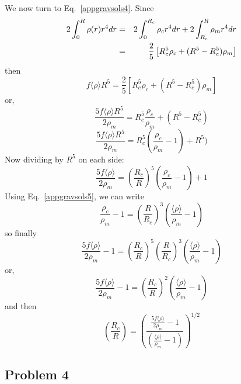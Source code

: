 We now turn to Eq.~\eqref{appgravsols4}. Since 
\begin{eqnarray}
2 \int_0^R \rho(r) r^4 dr 
&=&   2 \int_0^{R_c} \rho_c r^4 dr +  2 \int_{R_c}^R \rho_m r^4 dr \nonumber\\
&=& \frac{2}{5} \left[ R_c^5  \rho_c + (R^5-R_c^5) \rho_m  \right]  \nonumber
\end{eqnarray}
then 
\[
f \langle \rho \rangle R^5 = \frac{2}{5} \left[ R_c^5  \rho_c + (R^5-R_c^5) \rho_m  \right] 
\]
or, 
\[
\frac{5 f \langle \rho \rangle R^5}{2 \rho_m} =   R_c^5  \frac{\rho_c}{\rho_m} + (R^5-R_c^5)  
\]
\[
\frac{5 f \langle \rho \rangle R^5}{2 \rho_m} =   R_c^5  (\frac{\rho_c}{\rho_m}-1) + R^5)  
\]
Now dividing by $R^5$ on each side:
\[
\frac{5 f \langle \rho \rangle }{2 \rho_m} =  \left(\frac{R_c}{R}\right)^5    \left(\frac{\rho_c}{\rho_m}-1 \right) + 1 
\]
Using Eq.~\eqref{appgravsols5}, we can write 
\[
\frac{\rho_c}{\rho_m}-1  = 
\left(\frac{R}{R_c}\right)^3 \left(\frac{\langle \rho \rangle}{\rho_m} -1\right) 
\]
so finally
\[
\frac{5 f \langle \rho \rangle }{2 \rho_m} - 1=  \left(\frac{R_c}{R}\right)^5     
\left(\frac{R}{R_c}\right)^3 \left(\frac{\langle \rho \rangle}{\rho_m} -1\right) 
\]
or, 
\[
\frac{5 f \langle \rho \rangle }{2 \rho_m} - 1=  \left(\frac{R_c}{R}\right)^2     
 \left(\frac{\langle \rho \rangle}{\rho_m} -1\right) 
\]
and then 
\[
\left(\frac{R_c}{R}\right)
=
\left( 
\frac{ \frac{5 f \langle \rho \rangle }{2 \rho_m} - 1  }{  \left(\frac{\langle \rho \rangle}{\rho_m} -1\right)  }
\right)^{1/2}
\]




\newpage
\subsection{Problem 4}

